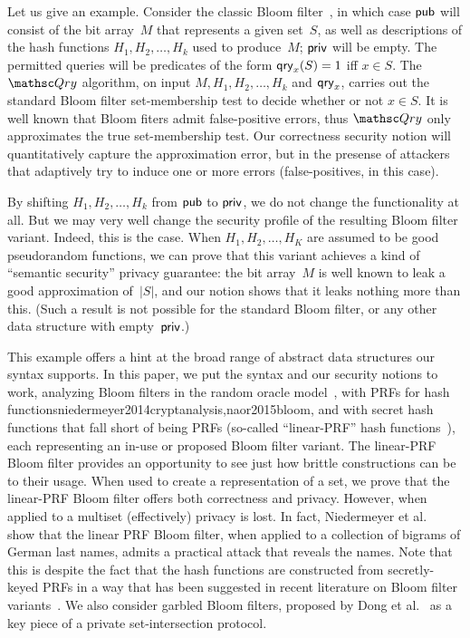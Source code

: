Let us give an example.  Consider the classic Bloom filter~\cite{bloom1970space}, in which case ${\sf pub}$ will consist of the bit array~$M$ that represents a given set~$S$, as well as descriptions of the hash functions $H_1,H_2,\ldots,H_k$ used to produce~$M$; ${\sf priv}$ will be empty.  The permitted queries will be predicates of the form $\mathsf{qry}_x(S)=1$ iff $x \in S$. The~$\Qry$ algorithm, on input $M,H_1,H_2,\ldots,H_k$ and $\mathsf{qry}_x$, carries out the standard Bloom filter set-membership test to decide whether or not $x \in S$.  It is well known that Bloom fiters admit false-positive errors, thus $\Qry$ only approximates the true set-membership test.  Our correctness security notion will quantitatively capture the approximation error, but in the presense of attackers that adaptively try to induce one or more errors (false-positives, in this case).  

By shifting $H_1,H_2,\ldots,H_k$ from ${\sf pub}$ to ${\sf priv}$, we do not change the functionality at all.  But we may very well change the security profile of the resulting Bloom filter variant.  Indeed, this is the case.  When $H_1,H_2,\ldots,H_K$ are assumed to be good pseudorandom functions, we can prove that this variant achieves a kind of ``semantic security'' privacy guarantee: the bit array~$M$ is well known to leak a good approximation of~$|S|$, and our notion shows that it leaks nothing more than this.  (Such a result is not possible for the standard Bloom filter, or any other data structure with empty~${\sf priv}$.)

This example offers a hint at the broad range of abstract data structures our syntax supports.  In this paper, we put the syntax and our security notions to work, analyzing Bloom filters in the random oracle model~\cite{broder2004network}, with PRFs for hash functions{niedermeyer2014cryptanalysis,naor2015bloom}, and with secret hash functions that fall short of being PRFs (so-called ``linear-PRF'' hash functions~\cite{kirsch2006less,niedermeyer2014cryptanalysis}), each representing an in-use or proposed Bloom filter variant.  The linear-PRF Bloom filter provides an opportunity to see just how brittle constructions can be to their usage.  When used to create a representation of a set, we prove that the linear-PRF Bloom filter offers both correctness and privacy.  However, when applied to a multiset (effectively) privacy is lost.  In fact, Niedermeyer et al.~\cite{niedermeyer2014cryptanalysis} show that the linear PRF Bloom filter, when applied to a collection of bigrams of German last names, admits a practical attack that reveals the names.  Note that this is despite the fact that the hash functions are constructed from secretly-keyed PRFs in a way that has been suggested in recent literature on Bloom filter variants~\cite{kirsch2006less}.  We also consider garbled Bloom filters, proposed by Dong et al.~\cite{dong2013private} as a key piece of a private set-intersection protocol.

